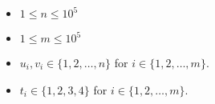 \begin{itemize}
	\tightlist
	\item $1\le n \le 10^5$
	\item $1\le m \le 10^5$
	\item $u_i,v_i\in \{1,2,\dots,n\}$ for $i\in\{1,2,\dots,m\}$.
	\item $t_i\in \{1,2,3,4\}$ for $i\in\{1,2,\dots,m\}$.
\end{itemize}
